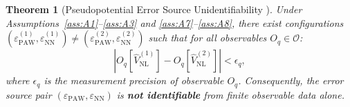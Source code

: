\documentclass[11pt,a4paper]{article}
\newtheorem{theorem}{Theorem}[section]
\theoremstyle{definition}
\begin{document}
\begin{theorem}[Pseudopotential Error Source Unidentifiability ]\label{thm:unidentifiability}
Under Assumptions~\ref{ass:A1}--\ref{ass:A3} and \ref{ass:A7}--\ref{ass:A8}, there exist configurations $(\varepsilon_{\mathrm{PAW}}^{(1)}, \varepsilon_{\mathrm{NN}}^{(1)}) \neq (\varepsilon_{\mathrm{PAW}}^{(2)}, \varepsilon_{\mathrm{NN}}^{(2)})$ such that for all observables $O_q \in \mathcal{O}$:
\begin{equation}\label{eq:obs_equiv}
|O_q[\hat{V}_{\mathrm{NL}}^{(1)}] - O_q[\hat{V}_{\mathrm{NL}}^{(2)}]| < \epsilon_q,
\end{equation}
where $\epsilon_q$ is the measurement precision of observable $O_q$. Consequently, the error source pair $(\varepsilon_{\mathrm{PAW}}, \varepsilon_{\mathrm{NN}})$ is \textbf{not identifiable} from finite observable data alone.
\end{theorem}
\end{document}
